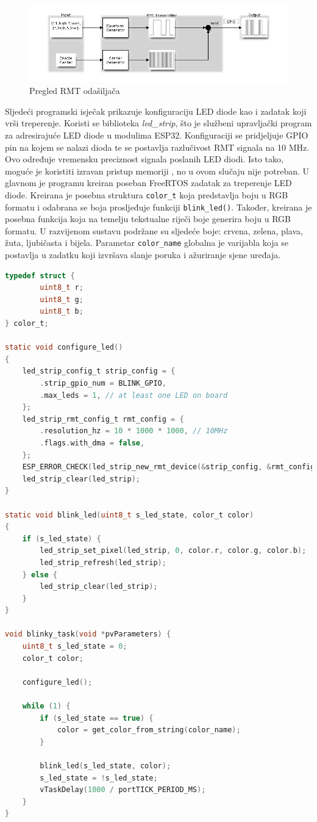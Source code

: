 \begin{figure}[ht]
	\centering
	\includegraphics[scale=0.5]{imgs/rmt}
	\caption{Pregled RMT odašiljača \cite{espressif}}
	\label{fig:rmt}
\end{figure}

Sljedeći programski isječak prikazuje konfiguraciju LED diode kao i zadatak koji vrši treperenje. Koristi se biblioteka \textit{led\_strip}, što je službeni upravljački program  za adresirajuće LED diode u modulima ESP32. Konfiguraciji se pridjeljuje GPIO pin na kojem se nalazi dioda te se postavlja razlučivost RMT signala na 10 MHz. Ovo određuje vremensku preciznost signala poslanih LED diodi. Isto tako, moguće je koristiti izravan pristup memoriji , no u ovom slučaju nije potreban. U glavnom je programu kreiran poseban FreeRTOS zadatak za treperenje LED diode. Kreirana je posebna struktura \lstinline|color_t| koja predstavlja boju u RGB formatu i odabrana se boja prosljeđuje funkciji \lstinline|blink_led()|. Također, kreirana je posebna funkcija koja na temelju tekstualne riječi boje generira boju u RGB formatu. U razvijenom sustavu podržane su sljedeće boje: crvena, zelena, plava, žuta, ljubičasta i bijela. Parametar \lstinline|color_name| globalna je varijabla koja se postavlja u zadatku koji izvršava slanje poruka i ažuriranje sjene uređaja. 

\begin{lstlisting}[caption={Upravljanje LED diodom}, language=c]
typedef struct {
		uint8_t r;
		uint8_t g;
		uint8_t b;
} color_t;

static void configure_led()
{
	led_strip_config_t strip_config = {
		.strip_gpio_num = BLINK_GPIO,
		.max_leds = 1, // at least one LED on board
	};
	led_strip_rmt_config_t rmt_config = {
		.resolution_hz = 10 * 1000 * 1000, // 10MHz
		.flags.with_dma = false,
	};
	ESP_ERROR_CHECK(led_strip_new_rmt_device(&strip_config, &rmt_config, &led_strip));
	led_strip_clear(led_strip);
}

static void blink_led(uint8_t s_led_state, color_t color)
{
	if (s_led_state) {
		led_strip_set_pixel(led_strip, 0, color.r, color.g, color.b);
		led_strip_refresh(led_strip);
	} else {
		led_strip_clear(led_strip);
	}
}

void blinky_task(void *pvParameters) {
	uint8_t s_led_state = 0;
	color_t color;
	
	configure_led();
	
	while (1) {
		if (s_led_state == true) {
			color = get_color_from_string(color_name);
		}
		
		blink_led(s_led_state, color);
		s_led_state = !s_led_state;
		vTaskDelay(1000 / portTICK_PERIOD_MS);
	}
}
\end{lstlisting}

